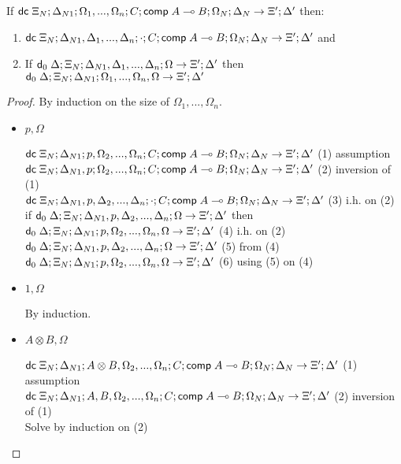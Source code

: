 If $\mathsf{dc} \; \Xi_N; \Delta_{N1}; \Omega_1, ..., \Omega_n; C; \mathsf{comp} \; A \multimap B; \Omega_N; \Delta_N \rightarrow \Xi'; \Delta'$ then:
\begin{enumerate}
   \item $\mathsf{dc} \; \Xi_N; \Delta_{N1}, \Delta_1, ..., \Delta_n; \cdot; C; \mathsf{comp} \; A \multimap B; \Omega_N; \Delta_N \rightarrow \Xi'; \Delta'$ and
   \item If $\mathsf{d}_0 \; \Delta; \Xi_N; \Delta_{N1}, \Delta_1, ..., \Delta_n; \Omega \rightarrow \Xi'; \Delta'$ then $\mathsf{d}_0 \; \Delta; \Xi_N; \Delta_{N1}; \Omega_1, ..., \Omega_n, \Omega \rightarrow \Xi'; \Delta'$
\end{enumerate}

\begin{proof}
   By induction on the size of $\Omega_1, ..., \Omega_n$.
   
   \begin{itemize}
      \item $p, \Omega$
      
      $\mathsf{dc} \; \Xi_N; \Delta_{N1}; p, \Omega_2, ..., \Omega_n; C; \mathsf{comp} \; A \multimap B; \Omega_N; \Delta_N \rightarrow \Xi'; \Delta'$ \hfill (1) assumption \\
      $\mathsf{dc} \; \Xi_N; \Delta_{N1}, p; \Omega_2, ..., \Omega_n; C; \mathsf{comp} \; A \multimap B; \Omega_N; \Delta_N \rightarrow \Xi'; \Delta'$ \hfill (2) inversion of (1) \\
      $\mathsf{dc} \; \Xi_N; \Delta_{N1}, p, \Delta_2, ..., \Delta_n; \cdot; C; \mathsf{comp} \; A \multimap B; \Omega_N; \Delta_N \rightarrow \Xi'; \Delta'$ \hfill (3) i.h. on (2) \\
      if $\mathsf{d}_0 \; \Delta; \Xi_N; \Delta_{N1}, p, \Delta_2, ..., \Delta_n; \Omega \rightarrow \Xi'; \Delta'$ then $\mathsf{d}_0 \; \Delta; \Xi_N; \Delta_{N1}; p, \Omega_2, ..., \Omega_n, \Omega \rightarrow \Xi'; \Delta'$ \hfill (4) i.h. on (2) \\
      $\mathsf{d}_0 \; \Delta; \Xi_N; \Delta_{N1}, p, \Delta_2, ..., \Delta_n; \Omega \rightarrow \Xi'; \Delta'$ \hfill (5) from (4) \\
      $\mathsf{d}_0 \; \Delta; \Xi_N; \Delta_{N1}; p, \Omega_2, ..., \Omega_n, \Omega \rightarrow \Xi'; \Delta'$ \hfill (6) using (5) on (4) \\
      
      \item $1, \Omega$
      
      By induction.
      
      \item $A \otimes B, \Omega$
      
      $\mathsf{dc} \; \Xi_N; \Delta_{N1}; A \otimes B, \Omega_2, ..., \Omega_n; C; \mathsf{comp} \; A \multimap B; \Omega_N; \Delta_N \rightarrow \Xi'; \Delta'$ \hfill (1) assumption \\
      $\mathsf{dc} \; \Xi_N; \Delta_{N1}; A, B, \Omega_2, ..., \Omega_n; C; \mathsf{comp} \; A \multimap B; \Omega_N; \Delta_N \rightarrow \Xi'; \Delta'$ \hfill (2) inversion of (1) \\
      Solve by induction on (2) \\
   \end{itemize}
\end{proof}

